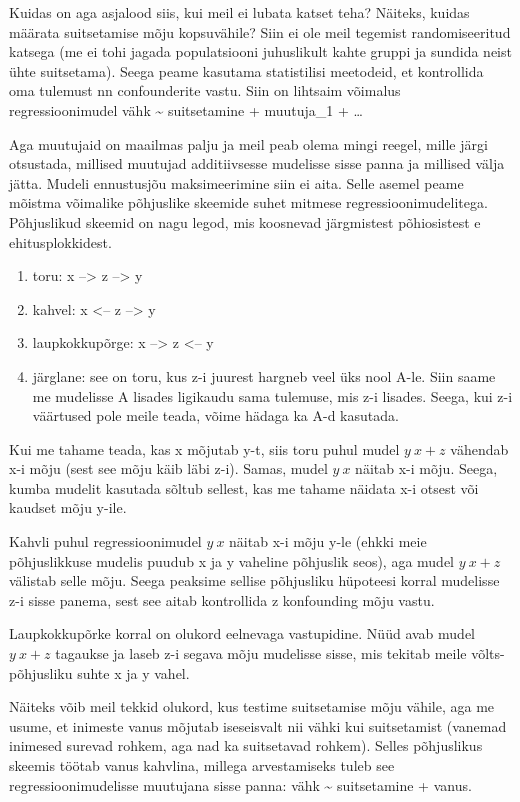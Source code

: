 \documentclass[]{book}
\begin{document}
Kuidas on aga asjalood siis, kui meil ei lubata katset teha? Näiteks,
kuidas määrata suitsetamise mõju kopsuvähile? Siin ei ole meil tegemist
randomiseeritud katsega (me ei tohi jagada populatsiooni juhuslikult
kahte gruppi ja sundida neist ühte suitsetama). Seega peame kasutama
statistilisi meetodeid, et kontrollida oma tulemust nn confounderite
vastu. Siin on lihtsaim võimalus regressioonimudel vähk
\textasciitilde{} suitsetamine + muutuja\_1 + \ldots{}

Aga muutujaid on maailmas palju ja meil peab olema mingi reegel, mille
järgi otsustada, millised muutujad additiivsesse mudelisse sisse panna
ja millised välja jätta. Mudeli ennustusjõu maksimeerimine siin ei aita.
Selle asemel peame mõistma võimalike põhjuslike skeemide suhet mitmese
regressioonimudelitega. Põhjuslikud skeemid on nagu legod, mis koosnevad
järgmistest põhiosistest e ehitusplokkidest.

\begin{enumerate}
\def\labelenumi{\arabic{enumi}.}
\item
  toru: x --\textgreater{} z --\textgreater{} y
\item
  kahvel: x \textless{}-- z --\textgreater{} y
\item
  laupkokkupõrge: x --\textgreater{} z \textless{}-- y
\item
  järglane: see on toru, kus z-i juurest hargneb veel üks nool A-le.
  Siin saame me mudelisse A lisades ligikaudu sama tulemuse, mis z-i
  lisades. Seega, kui z-i väärtused pole meile teada, võime hädaga ka
  A-d kasutada.
\end{enumerate}

Kui me tahame teada, kas x mõjutab y-t, siis toru puhul mudel
\(y ~ x + z\) vähendab x-i mõju (sest see mõju käib läbi z-i). Samas,
mudel \(y ~ x\) näitab x-i mõju. Seega, kumba mudelit kasutada sõltub
sellest, kas me tahame näidata x-i otsest või kaudset mõju y-ile.

Kahvli puhul regressioonimudel \(y ~ x\) näitab x-i mõju y-le (ehkki
meie põhjuslikkuse mudelis puudub x ja y vaheline põhjuslik seos), aga
mudel \(y ~ x + z\) välistab selle mõju. Seega peaksime sellise
põhjusliku hüpoteesi korral mudelisse z-i sisse panema, sest see aitab
kontrollida z konfounding mõju vastu.

Laupkokkupõrke korral on olukord eelnevaga vastupidine. Nüüd avab mudel
\(y ~ x + z\) tagaukse ja laseb z-i segava mõju mudelisse sisse, mis
tekitab meile võlts-põhjusliku suhte x ja y vahel.

Näiteks võib meil tekkid olukord, kus testime suitsetamise mõju vähile,
aga me usume, et inimeste vanus mõjutab iseseisvalt nii vähki kui
suitsetamist (vanemad inimesed surevad rohkem, aga nad ka suitsetavad
rohkem). Selles põhjuslikus skeemis töötab vanus kahvlina, millega
arvestamiseks tuleb see regressioonimudelisse muutujana sisse panna:
vähk \textasciitilde{} suitsetamine + vanus.
\end{document}
